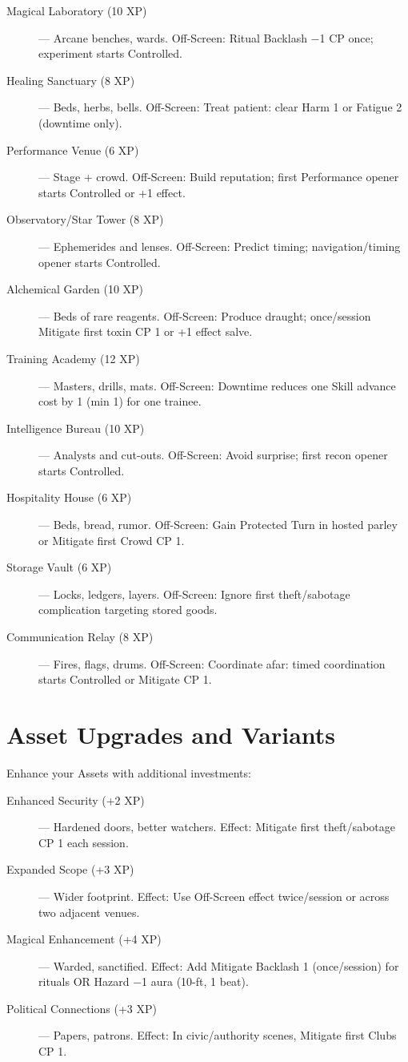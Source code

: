 \begin{description}
  \item[Magical Laboratory (10 XP)] — Arcane benches, wards. Off-Screen: Ritual Backlash −1 CP once; experiment starts Controlled.
  \item[Healing Sanctuary (8 XP)] — Beds, herbs, bells. Off-Screen: Treat patient: clear Harm 1 or Fatigue 2 (downtime only).
  \item[Performance Venue (6 XP)] — Stage + crowd. Off-Screen: Build reputation; first Performance opener starts Controlled or +1 effect.
  \item[Observatory/Star Tower (8 XP)] — Ephemerides and lenses. Off-Screen: Predict timing; navigation/timing opener starts Controlled.
  \item[Alchemical Garden (10 XP)] — Beds of rare reagents. Off-Screen: Produce draught; once/session Mitigate first toxin CP 1 or +1 effect salve.
  \item[Training Academy (12 XP)] — Masters, drills, mats. Off-Screen: Downtime reduces one Skill advance cost by 1 (min 1) for one trainee.
  \item[Intelligence Bureau (10 XP)] — Analysts and cut-outs. Off-Screen: Avoid surprise; first recon opener starts Controlled.
  \item[Hospitality House (6 XP)] — Beds, bread, rumor. Off-Screen: Gain Protected Turn in hosted parley or Mitigate first Crowd CP 1.
  \item[Storage Vault (6 XP)] — Locks, ledgers, layers. Off-Screen: Ignore first theft/sabotage complication targeting stored goods.
  \item[Communication Relay (8 XP)] — Fires, flags, drums. Off-Screen: Coordinate afar: timed coordination starts Controlled or Mitigate CP 1.
\end{description}

\section{Asset Upgrades and Variants}

Enhance your Assets with additional investments:

\begin{description}
  \item[Enhanced Security (+2 XP)] — Hardened doors, better watchers. Effect: Mitigate first theft/sabotage CP 1 each session.
  \item[Expanded Scope (+3 XP)] — Wider footprint. Effect: Use Off-Screen effect twice/session or across two adjacent venues.
  \item[Magical Enhancement (+4 XP)] — Warded, sanctified. Effect: Add Mitigate Backlash 1 (once/session) for rituals OR Hazard −1 aura (10-ft, 1 beat).
  \item[Political Connections (+3 XP)] — Papers, patrons. Effect: In civic/authority scenes, Mitigate first Clubs CP 1.
\end{description}

